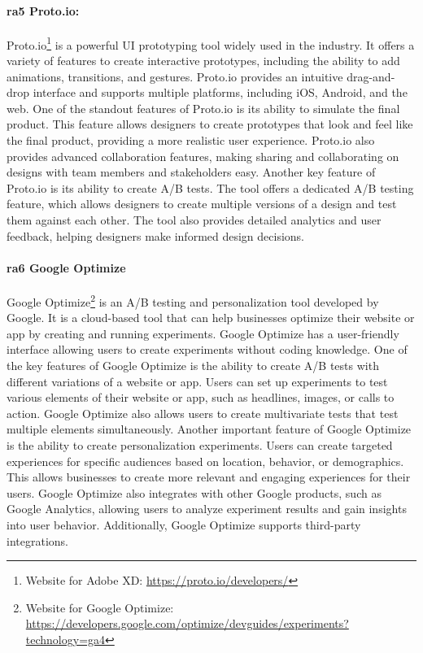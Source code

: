\paragraph{\ac{ra}5 Proto.io:} 
Proto.io\footnote{Website for Adobe XD: \url{https://proto.io/developers/}} is a powerful UI prototyping tool widely used in the industry. 
It offers a variety of features to create interactive prototypes, including the ability to add animations, transitions, and gestures. 
Proto.io provides an intuitive drag-and-drop interface and supports multiple platforms, including iOS, Android, and the web.
One of the standout features of Proto.io is its ability to simulate the final product. 
This feature allows designers to create prototypes that look and feel like the final product, providing a more realistic user experience. 
Proto.io also provides advanced collaboration features, making sharing and collaborating on designs with team members and stakeholders easy.
Another key feature of Proto.io is its ability to create A/B tests. The tool offers a dedicated A/B testing feature, which allows designers to create multiple versions of a design and test them against each other. The tool also provides detailed analytics and user feedback, helping designers make informed design decisions.

\paragraph{\ac{ra}6 Google Optimize}
Google Optimize\footnote{Website for Google Optimize: \url{https://developers.google.com/optimize/devguides/experiments?technology=ga4}} is an A/B testing and personalization tool developed by Google. 
It is a cloud-based tool that can help businesses optimize their website or app by creating and running experiments. 
Google Optimize has a user-friendly interface allowing users to create experiments without coding knowledge. 
One of the key features of Google Optimize is the ability to create A/B tests with different variations of a website or app. 
Users can set up experiments to test various elements of their website or app, such as headlines, images, or calls to action. 
Google Optimize also allows users to create multivariate tests that test multiple elements simultaneously.
Another important feature of Google Optimize is the ability to create personalization experiments. 
Users can create targeted experiences for specific audiences based on location, behavior, or demographics. 
This allows businesses to create more relevant and engaging experiences for their users.
Google Optimize also integrates with other Google products, such as Google Analytics, allowing users to analyze experiment results and gain insights into user behavior. 
Additionally, Google Optimize supports third-party integrations.

